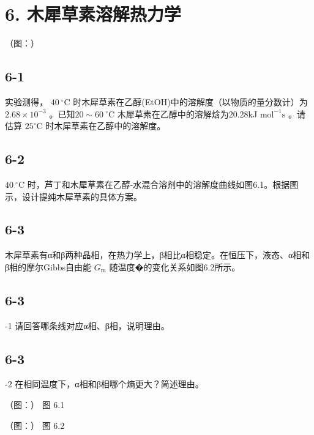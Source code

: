 \section*{6. 木犀草素溶解热力学}
（图：）

\subsection*{6-1}
实验测得， $4 0 ~ ^ { \circ } \mathrm { C }$ 时⽊犀草素在⼄醇(EtOH)中的溶解度（以物质的量分数计）为 $2 . 6 8 \times 1 0 ^ { - 3 }$ 。已知$2 0 { \sim } 6 0 ~ ^ { \circ } \mathrm { C }$ ⽊犀草素在⼄醇中的溶解焓为20.28kJ $\mathrm { m o l ^ { - 1 } s }$ 。请估算 $2 5 ^ { \circ } \mathrm { C }$ 时⽊犀草素在⼄醇中的溶解度。

\subsection*{6-2}
$4 0 ~ ^ { \circ } \mathrm { C }$ 时，芦丁和⽊犀草素在⼄醇-⽔混合溶剂中的溶解度曲线如图6.1。根据图⽰，设计提纯⽊犀草素的具体⽅案。

\subsection*{6-3}
⽊犀草素有α和β两种晶相，在热⼒学上，β相⽐α相稳定。在恒压下，液态、α相和β相的摩尔Gibbs⾃由能 $G _ { \mathrm { m } }$ 随温度�的变化关系如图6.2所⽰。

\subsection*{6-3}
-1 请回答哪条线对应α相、β相，说明理由。

\subsection*{6-3}
-2 在相同温度下，α相和β相哪个熵更⼤？简述理由。

（图：）
图 6.1

（图：）
图 6.2
